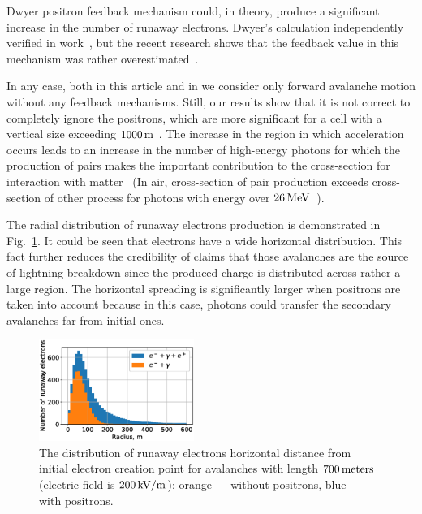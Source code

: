 \documentclass[doublecol,linenumbers]{epl2} %
\begin{document}
    Dwyer positron feedback mechanism \cite{Dwyer2012feedback} could, in theory, produce a significant increase in the number of runaway electrons. Dwyer's calculation independently verified in work~\cite{skeltved2014}, but the recent research shows that the feedback value in this mechanism was rather overestimated~\cite{npmdwyer}.
    
    In any case, both in this article and in \cite{Oreshkin_2018} we consider only forward avalanche motion without any feedback mechanisms. Still, our results show that it is not correct to completely ignore the positrons, which are more significant for a cell with a vertical size exceeding $1000\un{m}$ . The increase in the region in which acceleration occurs leads to an increase in the number of high-energy photons for which the production of pairs makes the important contribution to the cross-section for interaction with matter~\cite{heitler1984quantum, Geant2016} (In air, cross-section of pair production exceeds cross-section of other process for photons with energy over $26~\un{MeV}$~\cite{xcom}).
    
    The radial distribution of runaway electrons production is demonstrated in Fig.~\ref{fig:rad}. It could be seen that electrons have a wide horizontal distribution. This fact further reduces the credibility of claims that those avalanches are the source of lightning breakdown since the produced charge is distributed across rather a large region. The horizontal spreading is significantly larger when positrons are taken into account because in this case, photons could transfer the secondary avalanches far from initial ones.
    
    \begin{figure}[h]
        \centering
        \includegraphics[width=0.45\textwidth]{figures/radial.eps}
        \caption{The distribution of runaway electrons horizontal distance from initial electron creation point for avalanches with length $700\un{meters}$ (electric field is $200\un{kV/m}$): orange --- without positrons, blue --- with positrons. }
        \label{fig:rad}
    \end{figure}
    
\end{document}
